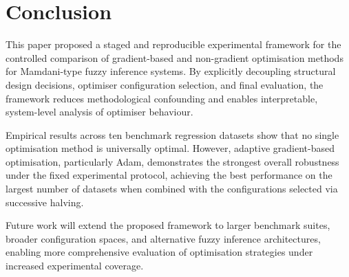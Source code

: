 \documentclass[a4paper,12pt,oneside]{article}
\begin{document}
\section{Conclusion}

This paper proposed a staged and reproducible experimental framework for the
controlled comparison of gradient-based and non-gradient optimisation methods
for Mamdani-type fuzzy inference systems.
By explicitly decoupling structural design decisions, optimiser configuration
selection, and final evaluation, the framework reduces methodological
confounding and enables interpretable, system-level analysis of optimiser
behaviour.

Empirical results across ten benchmark regression datasets show that no single
optimisation method is universally optimal.
However, adaptive gradient-based optimisation, particularly Adam, demonstrates
the strongest overall robustness under the fixed experimental protocol,
achieving the best performance on the largest number of datasets when combined
with the configurations selected via successive halving.

Future work will extend the proposed framework to larger benchmark suites,
broader configuration spaces, and alternative fuzzy inference architectures,
enabling more comprehensive evaluation of optimisation strategies under
increased experimental coverage.
\end{document}
